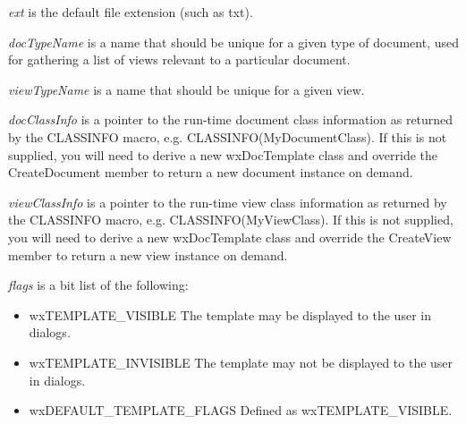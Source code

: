 {\it ext} is the default file extension (such as txt).

{\it docTypeName} is a name that should be unique for a given type of document, used for
gathering a list of views relevant to a particular document.

{\it viewTypeName} is a name that should be unique for a given view.

{\it docClassInfo} is a pointer to the run-time document class information as returned
by the CLASSINFO macro, e.g. CLASSINFO(MyDocumentClass). If this is not supplied,
you will need to derive a new wxDocTemplate class and override the CreateDocument
member to return a new document instance on demand.

{\it viewClassInfo} is a pointer to the run-time view class information as returned
by the CLASSINFO macro, e.g. CLASSINFO(MyViewClass). If this is not supplied,
you will need to derive a new wxDocTemplate class and override the CreateView
member to return a new view instance on demand.

{\it flags} is a bit list of the following:

\begin{itemize}\itemsep=0pt
\item wxTEMPLATE\_VISIBLE The template may be displayed to the user in dialogs.
\item wxTEMPLATE\_INVISIBLE The template may not be displayed to the user in dialogs.
\item wxDEFAULT\_TEMPLATE\_FLAGS Defined as wxTEMPLATE\_VISIBLE.
\end{itemize}


